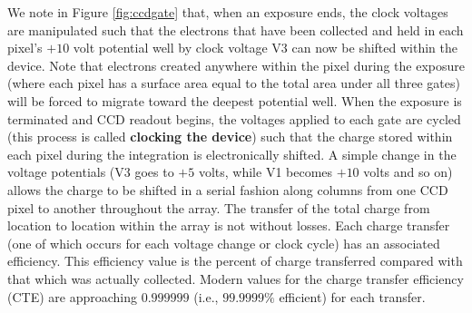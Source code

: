 \documentclass[a4paper,10pt]{article}
\begin{document}
{\noindent}We note in Figure \ref{fig:ccdgate} that, when an exposure ends, the clock voltages are manipulated such that the electrons that have been collected and held in each pixel's $+10$ volt potential well by clock voltage V3 can now be shifted within the device. Note that electrons created anywhere within the pixel during the exposure (where each pixel has a surface area equal to the total area under all three gates) will be forced to migrate toward the deepest potential well. When the exposure is terminated and CCD readout begins, the voltages applied to each gate are cycled (this process is called \textbf{clocking the device}) such that the charge stored within each pixel during the integration is electronically shifted. A simple change in the voltage potentials (V3 goes to $+5$ volts, while V1 becomes $+10$ volts and so on) allows the charge to be shifted in a serial fashion along columns from one CCD pixel to another throughout the array. The transfer of the total charge from location to location within the array is not without losses. Each charge transfer (one of which occurs for each voltage change or clock cycle) has an associated efficiency. This efficiency value is the percent of charge transferred compared with that which was actually collected. Modern values for the charge transfer efficiency (CTE) are approaching $0.999999$ (i.e., $99.9999\%$ efficient) for each transfer.
\end{document}

